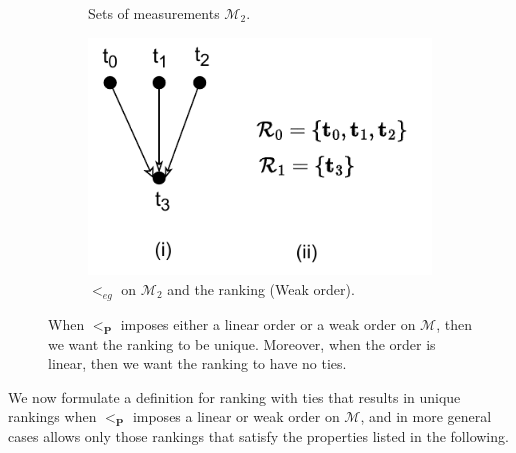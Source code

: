 \documentclass[acmsmall,screen, review]{acmart}
\begin{document}
\begin{figure}[h!]
\begin{subfigure}[b]{0.59\textwidth}
		\caption{Sets of measurements $\mathcal{M}_2$.}
		\label{fig:weak-eg}
	\end{subfigure}
	\begin{subfigure}[b]{0.39\textwidth}
		\centering
		\includegraphics[width=0.85\linewidth]{fig/ch3/pr-def-weak.pdf}
		\caption{$<_{eg}$ on $\mathcal{M}_2$ and the ranking (Weak order).}
		\label{fig:weak}
	\end{subfigure}
	
	\caption{When $<_{\mathbf{P}} $ imposes either a linear order or a weak order on $\mathcal{M}$, then we want the ranking to be unique. Moreover, when the order is linear, then we want the ranking to have no ties.}
	\label{fig:pr-def}
\end{figure}

We now formulate a definition for ranking with ties that results in unique rankings when $<_{\mathbf{P}} $  imposes a linear or weak order on $\mathcal{M}$, and in more general cases allows only those rankings that satisfy the properties listed in the following.

\end{document}

